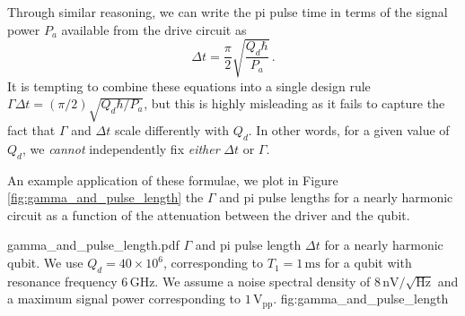 Through similar reasoning, we can write the pi pulse time in terms of the signal power $P_a$ available from the drive circuit as
\begin{equation}
  \boxed{\Delta t = \frac{\pi}{2} \sqrt{ \frac{Q_d \hbar}{P_a}}\, .}
\end{equation}
It is tempting to combine these equations into a single design rule $\Gamma \Delta t = (\pi/2) \sqrt{Q_d \hbar / P_a}$, but this is highly misleading as it fails to capture the fact that $\Gamma$ and $\Delta t$ scale differently with $Q_d$.
In other words, for a given value of $Q_d$, we \emph{cannot} independently fix \emph{either} $\Delta t$ or $\Gamma$.

An example application of these formulae, we plot in Figure \ref{fig:gamma_and_pulse_length} the $\Gamma$ and pi pulse lengths for a nearly harmonic circuit as a function of the attenuation between the driver and the qubit.

\quickfig{\columnwidth}
{gamma_and_pulse_length.pdf}
{$\Gamma$ and pi pulse length $\Delta t$ for a nearly harmonic qubit.
We use $Q_d = 40 \times 10^6$, corresponding to $T_1=1\,\text{ms}$ for a qubit with resonance frequency 6\,GHz.
We assume a noise spectral density of $8\,\text{nV}/\sqrt{\text{Hz}}$ and a maximum signal power corresponding to $1\,\text{V}_\text{pp}$.}
{fig:gamma_and_pulse_length}


